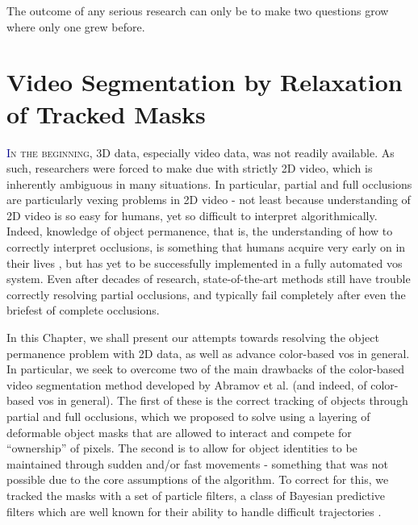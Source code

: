 \begin{savequote}[75mm]
The outcome of any serious research can only be to make two questions grow where only one grew before.
\end{savequote}


\chapter{Video Segmentation by Relaxation of Tracked Masks}
\label{Chap:VideoSegRelaxation}
\lettrine[lines=3, loversize=0.3]{\textcolor{DarkBlue}I}{n the beginning}, 3D data, especially video data, was not readily available. As such, researchers were forced to make due with strictly 2D video, which is inherently ambiguous in many situations. In particular, partial and full occlusions are particularly vexing problems in 2D video - not least because understanding of 2D video is so easy for humans, yet so difficult to interpret algorithmically. Indeed, knowledge of object permanence, that is, the understanding of how to correctly interpret occlusions, is something that humans acquire very early on in their lives \cite{kandel2000principles}, but has yet to be successfully implemented in a fully automated \gls{vos} system. Even after decades of research, state-of-the-art methods still have trouble correctly resolving partial occlusions, and typically fail completely after even the briefest of complete occlusions.

In this Chapter, we shall present our attempts towards resolving the object permanence problem with 2D data, as well as advance color-based \gls{vos} in general. In particular, we seek to overcome two of the main drawbacks of the color-based video segmentation method developed by Abramov et al. \cite{Abramov_RealtimeSegmentation} (and indeed, of color-based \gls{vos} in general). The first of these is the correct tracking of objects through partial and full occlusions, which we proposed to solve using a layering of deformable object masks that are allowed to interact and compete for ``ownership'' of pixels. The second is to allow for object identities to be maintained through sudden and/or fast movements - something that was not possible due to the core assumptions of the algorithm. To correct for this, we tracked the masks with a set of particle filters, a class of Bayesian predictive filters which are well known for their ability to handle difficult trajectories \cite{TrackingMultipleParticleFiltering,MonteCarloMTT,SequentialMonteCarloMultitargetFiltering}.

